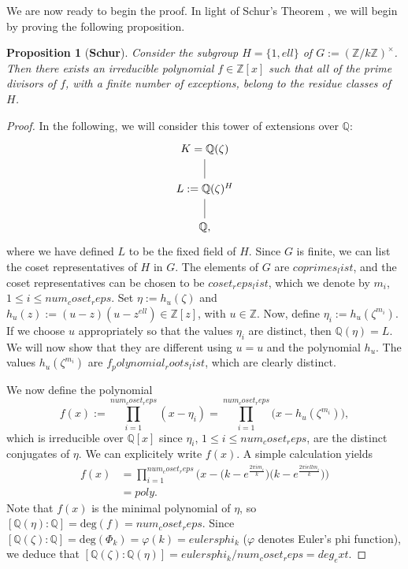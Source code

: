 \documentclass[a4paper, 12pt]{article}
\newtheorem{proposition}[theorem]{Proposition}
\theoremstyle{definition}
\theoremstyle{remark}
\newcommand{\Z}{\ensuremath{\mathbb{Z}}}
\newcommand{\Q}{\ensuremath{\mathbb{Q}}}
\begin{document}
We are now ready to begin the proof. In light of Schur's Theorem \cite{Murty}, we will begin by proving the following proposition.

\begin{proposition}[\textbf{Schur}]\label{th4murty}
Consider the subgroup $H=\{1, {ell}\}$ of $G:=(\Z/{k}\Z)^\times$. Then there exists an irreducible polynomial $f\in\Z[x]$ such that all of the prime divisors of $f$, with a finite number of exceptions, belong to the residue classes of $H$.
\end{proposition}
\begin{proof}
In the following, we will consider this tower of extensions over $\Q$:
	\[
	\begin{tikzcd}	
	K=\Q(\zeta) \arrow[d, dash] \\ 
	L:=\Q(\zeta)^H \arrow[d, dash] \\ 
	\Q,
	\end{tikzcd}
	\]
\vspace{0.2cm}
where we have defined $L$ to be the fixed field of $H$. Since $G$ is finite, we can list the coset representatives of $H$ in $G$. The elements of $G$ are ${coprimes_list}$, and the coset representatives can be chosen to be ${coset_reps_list}$, which we denote by $m_i$, $1\leqslant i \leqslant {num_coset_reps}$. Set $\eta:=h_u(\zeta)$ and $h_u(z):=(u-z)(u-z^{{ell}})\in\Z[z]$, with $u\in\Z$. Now, define $\eta_i:=h_u(\zeta^{m_i})$. If we choose $u$ appropriately so that the values $\eta_i$ are distinct, then $\Q(\eta)=L$. We will now show that they are different using $u={u}$ and the polynomial $h_{{u}}$. The values $h_{{u}}(\zeta^{m_i})$ are ${f_polynomial_roots_list}$, which are clearly distinct.

We now define the polynomial
\begin{equation}\label{polinomi}
f(x):=\prod_{i=1}^{{num_coset_reps}}(x-\eta_i)=\prod_{i=1}^{{num_coset_reps}}\big(x-h_{{u}}(\zeta^{m_i})\big),
\end{equation}
which is irreducible over $\Q[x]$ since $\eta_i$, $1\leqslant i \leqslant {num_coset_reps}$, are the distinct conjugates of $\eta$. We can explicitely write $f(x)$. A simple calculation yields
\begin{align*}
f(x)&=\prod_{i=1}^{{num_coset_reps}}\Big(x-\Big({k}-e^\frac{2\pi im_i}{{k}}\Big)\Big({k}-e^\frac{2\pi i{ell}m_i}{{k}}\Big)\Big)\\
&={poly}.
\end{align*}
 Note that $f(x)$ is the minimal polynomial of $\eta$, so $[\Q(\eta):\Q]=\text{deg}(f)={num_coset_reps}$. Since $[\Q(\zeta):\Q]=\text{deg}(\Phi_{{k}})=\varphi({k})={eulersphi_k}$ ($\varphi$ denotes Euler's phi function), we deduce that $[\Q(\zeta):\Q(\eta)]={eulersphi_k}/{num_coset_reps}={deg_ext}$. 
 

\end{proof}
\end{document}
